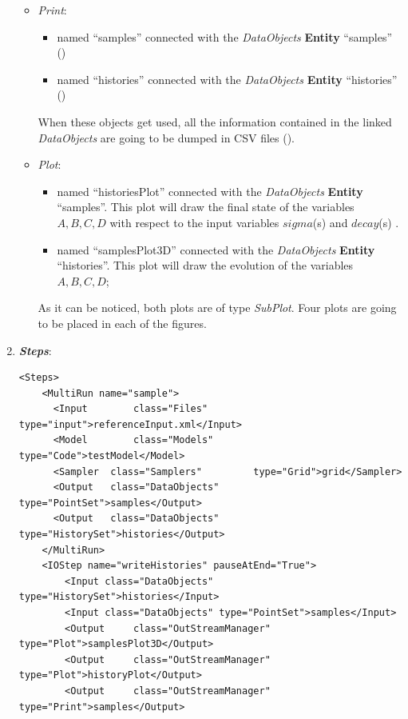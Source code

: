 \begin{enumerate}
\begin{itemize}
    \item \textit{Print}: 
     \begin{itemize}
       \item named ``samples'' connected with the \textit{DataObjects} \textbf{Entity} ``samples'' 
                ()
       \item named ``histories'' connected with the \textit{DataObjects} \textbf{Entity} ``histories'' ()          
     \end{itemize}         
      When these objects get used, all the information contained in the 
      linked  \textit{DataObjects} are going 
    to be dumped in CSV files ().
    \item \textit{Plot}: 
    \begin{itemize}
      \item named ``historiesPlot'' connected with the  \textit{DataObjects} 
      \textbf{Entity} ``samples''.  This plot will draw the final state of the
      variables $A,B,C,D$ with respect to the input variables $sigma$(s) 
      and $decay$(s) . 
      \item named ``samplesPlot3D'' connected with the  
      \textit{DataObjects} \textbf{Entity} ``histories''. This plot will draw the 
      evolution of the variables $A,B,C,D$;
    \end{itemize}
     As it can be noticed, both plots are of type \textit{SubPlot}. Four plots
     are going to be placed in each of the figures.
  \end{itemize}   
   \item \textbf{\textit{Steps}}:   
\begin{lstlisting}[style=XML,morekeywords={arg,extension,pauseAtEnd,overwrite}]
  <Steps>
    <MultiRun name="sample">
      <Input 	    class="Files" 			 type="input">referenceInput.xml</Input>
      <Model 	    class="Models" 		 type="Code">testModel</Model>
      <Sampler 	class="Samplers" 		 type="Grid">grid</Sampler>
      <Output 	class="DataObjects"  type="PointSet">samples</Output>
      <Output 	class="DataObjects"  type="HistorySet">histories</Output>
    </MultiRun>
    <IOStep name="writeHistories" pauseAtEnd="True">
        <Input class="DataObjects" type="HistorySet">histories</Input>
        <Input class="DataObjects" type="PointSet">samples</Input>
        <Output 	class="OutStreamManager" type="Plot">samplesPlot3D</Output>
        <Output 	class="OutStreamManager" type="Plot">historyPlot</Output>
        <Output 	class="OutStreamManager" type="Print">samples</Output>

\end{lstlisting}
\end{enumerate}
